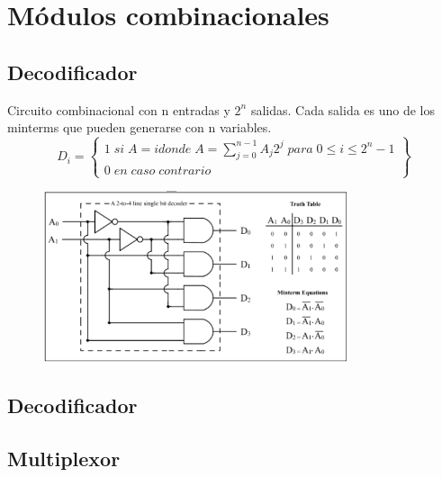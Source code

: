\section{Módulos combinacionales}

\subsection{Decodificador}
Circuito combinacional con n entradas y $2^{n}$ salidas. Cada salida es uno de los minterms que pueden generarse con n variables.
\[
    D_{i} =\left\{ \begin{array}{l}
        1\; si\; A=i donde\; A= \sum^{n-1}_{j=0}A_{j}2^{j}\; para\; 0 \leq i \leq 2^{n} -1 \\
        0 \; en \; caso \; contrario
    \end{array}\right\}
\]

\begin{figure}[H]
    \centering
    \includegraphics[width=0.8\textwidth]{images/Tema_3/Decodificador.PNG}
\end{figure}
\begin{figure}[H]
    \centering
    
\end{figure}

\subsection{Decodificador}
\begin{figure}[H]
    \centering
    
\end{figure}

\subsection{Multiplexor}

